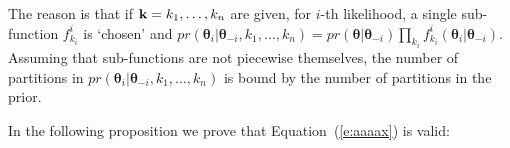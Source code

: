 The reason is that if  $\textbf{k}=k_1, \ldots, k_n$ are given, for $i$-th 
likelihood, a single sub-function $f^i_{k_i}$ is `chosen' and
$pr(\boldsymbol\theta_i | \boldsymbol\theta_{-i}, k_1, \ldots, k_n) = 
pr(\boldsymbol\theta | \boldsymbol\theta_{-i})\prod_{k_i} f^i_{k_i}(\boldsymbol\theta_i | \boldsymbol\theta_{-i})$.
Assuming that sub-functions are not piecewise themselves, 
the number of partitions in $pr(\boldsymbol\theta_i | \boldsymbol\theta_{-i},  k_1, \ldots, k_n)$ is bound by the number of partitions in the prior.

In the following proposition we prove that Equation~(\ref{e:aaaax}) is valid:

